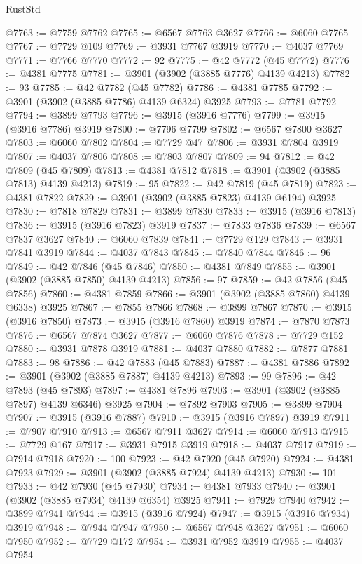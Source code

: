 \begin{lexlean}{RustStd}
\begin{coremodule}
@7763 := @7759 @7762
@7765 := @6567 @7763 @3627
@7766 := @6060 @7765
@7767 := @7729 @109
@7769 := @3931 @7767 @3919
@7770 := @4037 @7769
@7771 := @7766 @7770
@7772 := 92
@7775 := @42 @7772 (@45 @7772)
@7776 := @4381 @7775
@7781 := @3901 (@3902 (@3885 @7776) @4139 @4213)
@7782 := 93
@7785 := @42 @7782 (@45 @7782)
@7786 := @4381 @7785
@7792 := @3901 (@3902 (@3885 @7786) @4139 @6324) @3925
@7793 := @7781 @7792
@7794 := @3899 @7793
@7796 := @3915 (@3916 @7776)
@7799 := @3915 (@3916 @7786) @3919
@7800 := @7796 @7799
@7802 := @6567 @7800 @3627
@7803 := @6060 @7802
@7804 := @7729 @47
@7806 := @3931 @7804 @3919
@7807 := @4037 @7806
@7808 := @7803 @7807
@7809 := 94
@7812 := @42 @7809 (@45 @7809)
@7813 := @4381 @7812
@7818 := @3901 (@3902 (@3885 @7813) @4139 @4213)
@7819 := 95
@7822 := @42 @7819 (@45 @7819)
@7823 := @4381 @7822
@7829 := @3901 (@3902 (@3885 @7823) @4139 @6194) @3925
@7830 := @7818 @7829
@7831 := @3899 @7830
@7833 := @3915 (@3916 @7813)
@7836 := @3915 (@3916 @7823) @3919
@7837 := @7833 @7836
@7839 := @6567 @7837 @3627
@7840 := @6060 @7839
@7841 := @7729 @129
@7843 := @3931 @7841 @3919
@7844 := @4037 @7843
@7845 := @7840 @7844
@7846 := 96
@7849 := @42 @7846 (@45 @7846)
@7850 := @4381 @7849
@7855 := @3901 (@3902 (@3885 @7850) @4139 @4213)
@7856 := 97
@7859 := @42 @7856 (@45 @7856)
@7860 := @4381 @7859
@7866 := @3901 (@3902 (@3885 @7860) @4139 @6338) @3925
@7867 := @7855 @7866
@7868 := @3899 @7867
@7870 := @3915 (@3916 @7850)
@7873 := @3915 (@3916 @7860) @3919
@7874 := @7870 @7873
@7876 := @6567 @7874 @3627
@7877 := @6060 @7876
@7878 := @7729 @152
@7880 := @3931 @7878 @3919
@7881 := @4037 @7880
@7882 := @7877 @7881
@7883 := 98
@7886 := @42 @7883 (@45 @7883)
@7887 := @4381 @7886
@7892 := @3901 (@3902 (@3885 @7887) @4139 @4213)
@7893 := 99
@7896 := @42 @7893 (@45 @7893)
@7897 := @4381 @7896
@7903 := @3901 (@3902 (@3885 @7897) @4139 @6346) @3925
@7904 := @7892 @7903
@7905 := @3899 @7904
@7907 := @3915 (@3916 @7887)
@7910 := @3915 (@3916 @7897) @3919
@7911 := @7907 @7910
@7913 := @6567 @7911 @3627
@7914 := @6060 @7913
@7915 := @7729 @167
@7917 := @3931 @7915 @3919
@7918 := @4037 @7917
@7919 := @7914 @7918
@7920 := 100
@7923 := @42 @7920 (@45 @7920)
@7924 := @4381 @7923
@7929 := @3901 (@3902 (@3885 @7924) @4139 @4213)
@7930 := 101
@7933 := @42 @7930 (@45 @7930)
@7934 := @4381 @7933
@7940 := @3901 (@3902 (@3885 @7934) @4139 @6354) @3925
@7941 := @7929 @7940
@7942 := @3899 @7941
@7944 := @3915 (@3916 @7924)
@7947 := @3915 (@3916 @7934) @3919
@7948 := @7944 @7947
@7950 := @6567 @7948 @3627
@7951 := @6060 @7950
@7952 := @7729 @172
@7954 := @3931 @7952 @3919
@7955 := @4037 @7954

\end{coremodule}
\end{lexlean}
